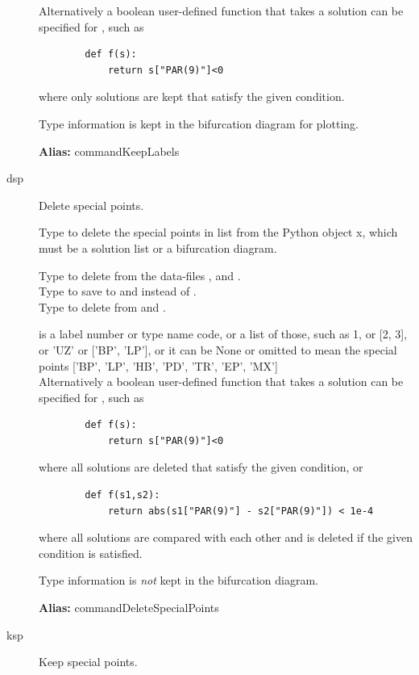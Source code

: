 \documentclass[12pt]{report}
\begin{document}
\begin{description}
    Alternatively a boolean user-defined function  that
    takes a solution can be specified for , such as
\begin{verbatim}
        def f(s):
            return s["PAR(9)"]<0
\end{verbatim}
    where only solutions are kept that satisfy the given condition.

    Type information is kept in the bifurcation diagram for plotting.

\textbf{Alias:} commandKeepLabels

\item[dsp]
Delete special points.

    Type  to delete the special points in list from
    the Python object x, which must be a solution list or a bifurcation diagram.

    Type  to delete from the data-files
    , and .\\
    Type  to save to  and
     instead of .\\
    Type  to delete from  and .

     is a label number or type name code, or a list of those,
    such as 1, or [2, 3], or 'UZ' or ['BP', 'LP'], or it can be None or
    omitted to mean the special points ['BP', 'LP', 'HB', 'PD', 'TR', 'EP',
    'MX']\\
    Alternatively a boolean user-defined function  that
    takes a solution can be specified for , such as
\begin{verbatim}
        def f(s):
            return s["PAR(9)"]<0
\end{verbatim}
    where all solutions are deleted that satisfy the given condition, or
\begin{verbatim}
        def f(s1,s2):
            return abs(s1["PAR(9)"] - s2["PAR(9)"]) < 1e-4
\end{verbatim}
    where all solutions are compared with each other and 
    is deleted if the given condition is satisfied.

    Type information is \emph{not} kept in the bifurcation diagram.

\textbf{Alias:} commandDeleteSpecialPoints

\item[ksp]
Keep special points.


\end{description}
\end{document}
